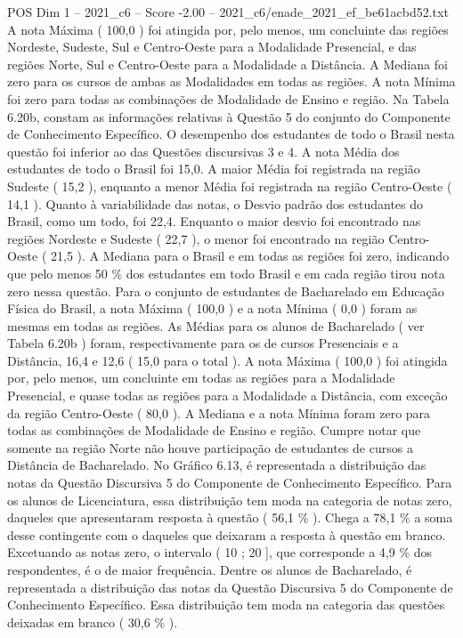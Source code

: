 \begin{textsample}{POS Dim 1 – 2021\_c6 – Score -2.00 – 2021\_c6/enade\_2021\_ef\_be61acbd52.txt}
A nota Máxima ( 100,0 ) foi atingida por, pelo menos, um concluinte das regiões Nordeste, Sudeste, Sul e Centro-Oeste para a Modalidade Presencial, e das regiões Norte, Sul e Centro-Oeste para a Modalidade a Distância.
A Mediana foi zero para os cursos de ambas as Modalidades em todas as regiões.
A nota Mínima foi zero para todas as combinações de Modalidade de Ensino e região.
Na Tabela 6.20b, constam as informações relativas à Questão 5 do conjunto do Componente de Conhecimento Específico.
O desempenho dos estudantes de todo o Brasil nesta questão foi inferior ao das Questões discursivas 3 e 4.
A nota Média dos estudantes de todo o Brasil foi 15,0.
A maior Média foi registrada na região Sudeste ( 15,2 ), enquanto a menor Média foi registrada na região Centro-Oeste ( 14,1 ).
Quanto à variabilidade das notas, o Desvio padrão dos estudantes do Brasil, como um todo, foi 22,4.
Enquanto o maior desvio foi encontrado nas regiões Nordeste e Sudeste ( 22,7 ), o menor foi encontrado na região Centro-Oeste ( 21,5 ).
A Mediana para o Brasil e em todas as regiões foi zero, indicando que pelo menos 50 \% dos estudantes em todo Brasil e em cada região tirou nota zero nessa questão.
Para o conjunto de estudantes de Bacharelado em Educação Física do Brasil, a nota Máxima ( 100,0 ) e a nota Mínima ( 0,0 ) foram as mesmas em todas as regiões.
As Médias para os alunos de Bacharelado ( ver Tabela 6.20b ) foram, respectivamente para os de cursos Presenciais e a Distância, 16,4 e 12,6 ( 15,0 para o total ).
A nota Máxima ( 100,0 ) foi atingida por, pelo menos, um concluinte em todas as regiões para a Modalidade Presencial, e quase todas as regiões para a Modalidade a Distância, com exceção da região Centro-Oeste ( 80,0 ).
A Mediana e a nota Mínima foram zero para todas as combinações de Modalidade de Ensino e região.
Cumpre notar que somente na região Norte não houve participação de estudantes de cursos a Distância de Bacharelado.
No Gráfico 6.13, é representada a distribuição das notas da Questão Discursiva 5 do Componente de Conhecimento Específico.
Para os alunos de Licenciatura, essa distribuição tem moda na categoria de notas zero, daqueles que apresentaram resposta à questão ( 56,1 \% ).
Chega a 78,1 \% a soma desse contingente com o daqueles que deixaram a resposta à questão em branco.
Excetuando as notas zero, o intervalo ( 10 ; 20 ], que corresponde a 4,9 \% dos respondentes, é o de maior frequência.
Dentre os alunos de Bacharelado, é representada a distribuição das notas da Questão Discursiva 5 do Componente de Conhecimento Específico.
Essa distribuição tem moda na categoria das questões deixadas em branco ( 30,6 \% ).

\end{textsample}

